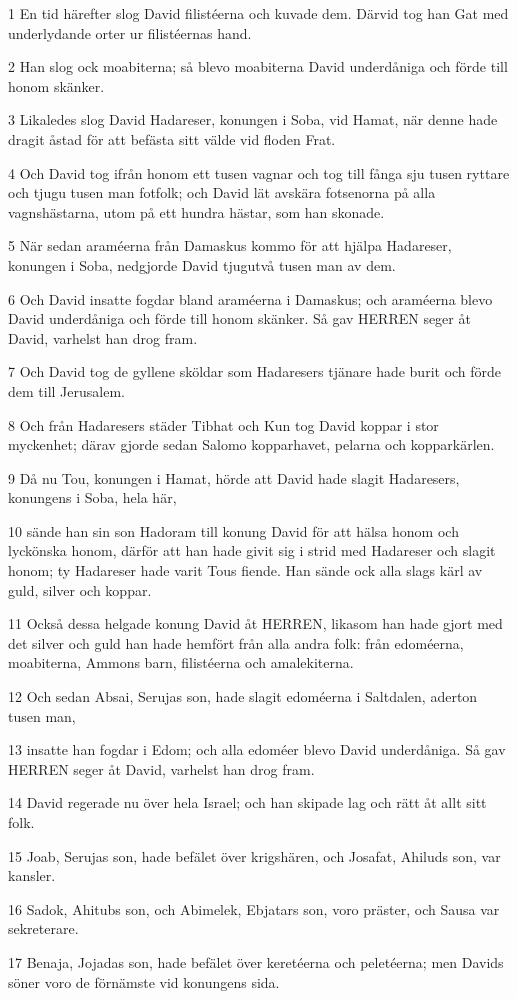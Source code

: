 \par 1 En tid härefter slog David filistéerna och kuvade dem. Därvid tog han Gat med underlydande orter ur filistéernas hand.
\par 2 Han slog ock moabiterna; så blevo moabiterna David underdåniga och förde till honom skänker.
\par 3 Likaledes slog David Hadareser, konungen i Soba, vid Hamat, när denne hade dragit åstad för att befästa sitt välde vid floden Frat.
\par 4 Och David tog ifrån honom ett tusen vagnar och tog till fånga sju tusen ryttare och tjugu tusen man fotfolk; och David lät avskära fotsenorna på alla vagnshästarna, utom på ett hundra hästar, som han skonade.
\par 5 När sedan araméerna från Damaskus kommo för att hjälpa Hadareser, konungen i Soba, nedgjorde David tjugutvå tusen man av dem.
\par 6 Och David insatte fogdar bland araméerna i Damaskus; och araméerna blevo David underdåniga och förde till honom skänker. Så gav HERREN seger åt David, varhelst han drog fram.
\par 7 Och David tog de gyllene sköldar som Hadaresers tjänare hade burit och förde dem till Jerusalem.
\par 8 Och från Hadaresers städer Tibhat och Kun tog David koppar i stor myckenhet; därav gjorde sedan Salomo kopparhavet, pelarna och kopparkärlen.
\par 9 Då nu Tou, konungen i Hamat, hörde att David hade slagit Hadaresers, konungens i Soba, hela här,
\par 10 sände han sin son Hadoram till konung David för att hälsa honom och lyckönska honom, därför att han hade givit sig i strid med Hadareser och slagit honom; ty Hadareser hade varit Tous fiende. Han sände ock alla slags kärl av guld, silver och koppar.
\par 11 Också dessa helgade konung David åt HERREN, likasom han hade gjort med det silver och guld han hade hemfört från alla andra folk: från edoméerna, moabiterna, Ammons barn, filistéerna och amalekiterna.
\par 12 Och sedan Absai, Serujas son, hade slagit edoméerna i Saltdalen, aderton tusen man,
\par 13 insatte han fogdar i Edom; och alla edoméer blevo David underdåniga. Så gav HERREN seger åt David, varhelst han drog fram.
\par 14 David regerade nu över hela Israel; och han skipade lag och rätt åt allt sitt folk.
\par 15 Joab, Serujas son, hade befälet över krigshären, och Josafat, Ahiluds son, var kansler.
\par 16 Sadok, Ahitubs son, och Abimelek, Ebjatars son, voro präster, och Sausa var sekreterare.
\par 17 Benaja, Jojadas son, hade befälet över keretéerna och peletéerna; men Davids söner voro de förnämste vid konungens sida.

